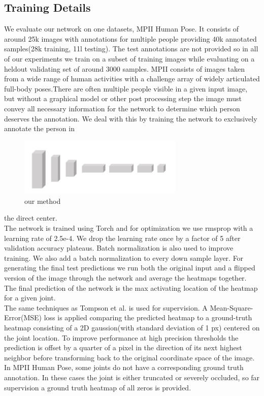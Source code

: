 \documentclass[final]{cvpr}
\begin{document}
\subsection{Training Details}
We evaluate our network on one datasets, MPII Human Pose. It consists of  around 25k images with annotations for multiple people providing 40k  annotated samples(28k training, 11l testing). The test annotations are not provided so in all of our experiments we train on a subset of training images while evaluating on a heldout validating set of around 3000 samples. MPII consists of images taken from a wide range of human activities with a challenge array of widely articulated full-body poses.\indent There are often multiple people visible in a given input image, but without a graphical model or other post processing step the image must convey all necessary information for the network to determine which person deserves the annotation. We deal with this by training the network to exclusively annotate the person in 
\begin{figure}[h]
\centering
\includegraphics[width=0.7\textwidth]{our method.jpg}
\caption{our method}
\end{figure}
the direct center.\\
\indent The network is trained using Torch and for optimization we use rmsprop with a learning rate of 2.5e-4. We drop the learning rate once by a factor of 5 after validation accuracy plateaus. Batch normalization\cite{ioffe2015batch} is also used to improve training. We also add a batch normalization to every down sample layer. For generating the final test predictions we run both the original input and a flipped version of the image through the network and average the heatmaps together. The final prediction of the network is the max activating location of the heatmap for a given joint.\\
\indent The same techniques as Tompson et al.\cite{tompson2014joint} is used for supervision. A Mean-Square-Error(MSE) loss is applied comparing the predicted heatmap to a ground-truth heatmap consisting of a 2D gaussion(with standard deviation of 1 px) centered on the joint location. To improve performance at high precision thresholds the prediction is offset by a quarter of a pixel in the direction of its next highest neighbor before transforming back to the original coordinate space of the image. In MPII Human Pose, some joints do not have a corresponding ground truth annotation. In these cases the joint is either truncated or severely occluded, so far supervision a ground truth heatmap of all zeros is provided.
\end{document}
